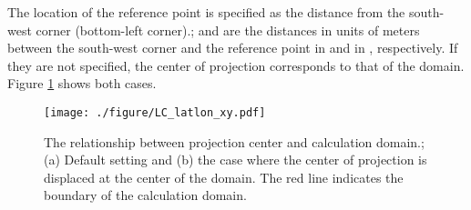 The location of the reference point is specified as the distance from the south-west corner (bottom-left corner).;
 and  are the distances in units of meters between the south-west corner and the reference point in \XDIR and in \YDIR, respectively.
If they are not specified, the center of projection corresponds to that of the domain.
Figure \ref{fig:map_lc} shows both cases.

\begin{figure}[t]
\begin{center}
  \texttt{[image: ./figure/LC\_latlon\_xy.pdf]}\\
  \caption{The relationship between projection center and calculation domain.; (a) Default setting and (b) the case where the center of projection is displaced at the center of the domain.
    The red line indicates the boundary of the calculation domain.}
  \label{fig:map_lc}
\end{center}
\end{figure}

